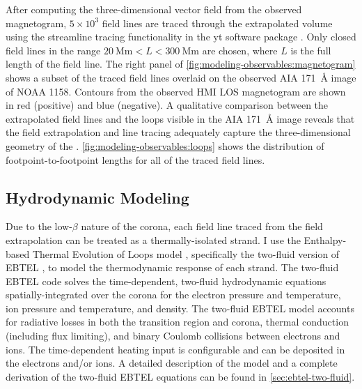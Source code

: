 After computing the three-dimensional vector field from the observed magnetogram, $5\times10^3$ field lines are traced through the extrapolated volume using the streamline tracing functionality in the yt software package \citep{turk_yt_2011}. Only closed field lines in the range $\SI{20}{\mega\m}<L<\SI{300}{\mega\m}$ are chosen, where $L$ is the full length of the field line. The right panel of \autoref{fig:modeling-observables:magnetogram} shows a subset of the traced field lines overlaid on the observed AIA \SI{171}{\angstrom} image of NOAA 1158. Contours from the observed HMI LOS magnetogram are shown in red (positive) and blue (negative). A qualitative comparison between the extrapolated field lines and the loops visible in the AIA \SI{171}{\angstrom} image reveals that the field extrapolation and line tracing adequately capture the three-dimensional geometry of the \AR{}. \autoref{fig:modeling-observables:loops} shows the distribution of footpoint-to-footpoint lengths for all of the traced field lines.

\subsection{Hydrodynamic Modeling}\label{sec:modeling-observables:loops}

Due to the low-$\beta$ nature of the corona, each field line traced from the field extrapolation can be treated as a thermally-isolated strand. I use the Enthalpy-based Thermal Evolution of Loops model \citep[EBTEL,][]{klimchuk_highly_2008,cargill_enthalpy-based_2012,cargill_enthalpy-based_2012-1}, specifically the two-fluid version of EBTEL \citep{barnes_inference_2016}, to model the thermodynamic response of each strand. The two-fluid EBTEL code solves the time-dependent, two-fluid hydrodynamic equations spatially-integrated over the corona for the electron pressure and temperature, ion pressure and temperature, and density. The two-fluid EBTEL model accounts for radiative losses in both the transition region and corona, thermal conduction (including flux limiting), and binary Coulomb collisions between electrons and ions. The time-dependent heating input is configurable and can be deposited in the electrons and/or ions. A detailed description of the model and a complete derivation of the two-fluid EBTEL equations can be found in \autoref{sec:ebtel-two-fluid}.

